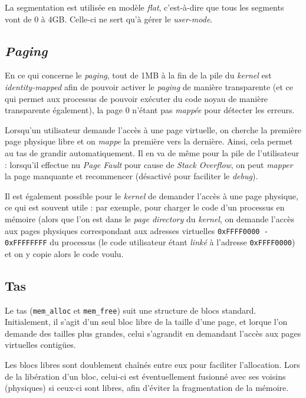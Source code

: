 \documentclass[a4paper, 10pt, french]{article}
\newcommand{\code}[1]{\texttt{#1}}
\newcommand{\foreign}[1]{\emph{#1}}
\begin{document}
La segmentation est utilisée en modèle \foreign{flat}, c'est-à-dire que tous les 
segments vont de 0 à 4GB. Celle-ci ne sert qu'à gérer le \foreign{user-mode}.


\subsection{\foreign{Paging}}

En ce qui concerne le \foreign{paging}, tout de 1MB à la fin de la pile du 
\foreign{kernel} est \foreign{identity-mapped} afin de pouvoir activer le 
\foreign{paging} de manière transparente (et ce qui permet aux processus de 
pouvoir exécuter du code noyau de manière transparente également), la page 0 
n'étant pas \foreign{mappée} pour détecter les erreurs.

Lorsqu'un utilisateur demande l'accès à une page virtuelle, on cherche la 
première page physique libre et on \foreign{mappe} la première vers la 
dernière. Ainsi, cela permet au tas de grandir automatiquement. Il en va de 
même pour la pile de l'utilisateur : lorsqu'il effectue nu \foreign{Page 
Fault} pour cause de \foreign{Stack Overflow}, on peut \foreign{mapper} la page 
manquante et recommencer (désactivé pour faciliter le \foreign{debug}).

Il est également possible pour le \foreign{kernel} de demander l'accès à une 
page physique, ce qui est souvent utile : par exemple, pour charger le code 
d'un processus en mémoire (alors que l'on est dans le \foreign{page directory} 
du \foreign{kernel}, on demande l'accès aux pages physiques correspondant aux 
adresses virtuelles \code{0xFFFF0000 - 0xFFFFFFFF} du processus (le code 
utilisateur étant \foreign{linké} à l'adresse \code{0xFFFF0000}) et on y copie 
alors le code voulu.

\subsection{Tas}

Le tas (\code{mem\string_alloc} et \code{mem\string_free}) suit une structure 
de blocs standard. Initialement, il s'agit d'un seul bloc libre de la taille 
d'une page, et lorque l'on demande des tailles plus grandes, celui s'agrandit 
en demandant l'accès aux pages virtuelles contigües.

Les blocs libres sont doublement chaînés entre eux pour faciliter l'allocation. 
Lors de la libération d'un bloc, celui-ci est éventuellement fusionné avec ses 
voisins (physiques) si ceux-ci sont libres, afin d'éviter la fragmentation de 
la mémoire.
\end{document}
